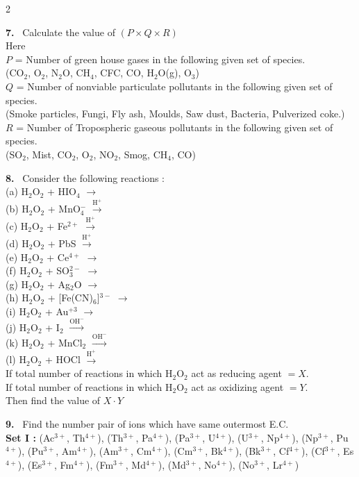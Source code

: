 \documentclass[10pt]{extarticle}
\newcommand{\qn}[1]{\par\smallskip\noindent\textbf{#1.}~}
\begin{document}
\begin{multicols}{2}
\qn{7} Calculate the value of $(P\times Q\times R)$\\
Here\\
$P$ = Number of green house gases in the following given set of species.\\
(CO$_2$, O$_2$, N$_2$O, CH$_4$, CFC, CO, H$_2$O(g), O$_3$)\\
$Q$ = Number of nonviable particulate pollutants in the following given set of species.\\
(Smoke particles, Fungi, Fly ash, Moulds, Saw dust, Bacteria, Pulverized coke.)\\
$R$ = Number of Tropospheric gaseous pollutants in the following given set of species.\\
(SO$_2$, Mist, CO$_2$, O$_2$, NO$_2$, Smog, CH$_4$, CO)
\qn{8} Consider the following reactions :\\
(a) H$_2$O$_2$ + HIO$_4$ $\longrightarrow$\\
(b) H$_2$O$_2$ + MnO$_4^-$ $\xrightarrow{\mathrm{H^+}}$\\
(c) H$_2$O$_2$ + Fe$^{2+}$ $\xrightarrow{\mathrm{H^+}}$\\
(d) H$_2$O$_2$ + PbS $\xrightarrow{\mathrm{H^+}}$\\
(e) H$_2$O$_2$ + Ce$^{4+}$ $\longrightarrow$\\
(f) H$_2$O$_2$ + SO$_3^{2-}$ $\longrightarrow$\\
(g) H$_2$O$_2$ + Ag$_2$O $\longrightarrow$\\
(h) H$_2$O$_2$ + [Fe(CN)$_6$]$^{3-}$ $\longrightarrow$\\
(i) H$_2$O$_2$ + Au$^{+3}$ $\longrightarrow$\\
(j) H$_2$O$_2$ + I$_2$ $\xrightarrow{\mathrm{OH^-}}$\\
(k) H$_2$O$_2$ + MnCl$_2$ $\xrightarrow{\mathrm{OH^-}}$\\
(l) H$_2$O$_2$ + HOCl $\xrightarrow{\mathrm{H^+}}$\\
If total number of reactions in which H$_2$O$_2$ act as reducing agent $=X$.\\
If total number of reactions in which H$_2$O$_2$ act as oxidizing agent $=Y$.\\
Then find the value of $X\cdot Y$
\qn{9} Find the number pair of ions which have same outermost E.C.\\
\textbf{Set I :} (Ac$^{3+}$, Th$^{4+}$), (Th$^{3+}$, Pa$^{4+}$), (Pa$^{3+}$, U$^{4+}$), (U$^{3+}$, Np$^{4+}$), (Np$^{3+}$, Pu$^{4+}$), (Pu$^{3+}$, Am$^{4+}$), (Am$^{3+}$, Cm$^{4+}$), (Cm$^{3+}$, Bk$^{4+}$), (Bk$^{3+}$, Cf$^{4+}$), (Cf$^{3+}$, Es$^{4+}$), (Es$^{3+}$, Fm$^{4+}$), (Fm$^{3+}$, Md$^{4+}$), (Md$^{3+}$, No$^{4+}$), (No$^{3+}$, Lr$^{4+}$)\\

\end{multicols}
\end{document}
